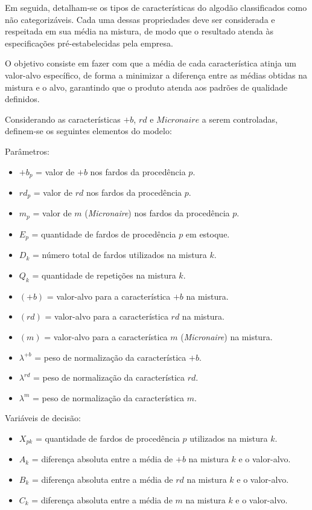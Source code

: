 \documentclass[
    12pt,                %
    openright,           %
    oneside,             %
    a4paper,             %
    english,             %
    spanish,             %
    brazil               %
]{ufscar}
\begin{document}
Em seguida, detalham-se os tipos de características do algodão classificados como não categorizáveis. Cada uma dessas propriedades deve ser considerada e respeitada em sua média na mistura, de modo que o resultado atenda às especificações pré-estabelecidas pela empresa.

O objetivo consiste em fazer com que a média de cada característica atinja um valor-alvo específico, de forma a minimizar a diferença entre as médias obtidas na mistura e o alvo, garantindo que o produto atenda aos padrões de qualidade definidos.

Considerando as características $+b$, $rd$ e $Micronaire$ a serem controladas, definem-se os seguintes elementos do modelo:

Parâmetros:

\begin{itemize}
    \item $+b_p$ = valor de $+b$ nos fardos da procedência $p$.
    \item $rd_p$ = valor de $rd$ nos fardos da procedência $p$.
    \item $m_p$ = valor de $m$ (\textit{Micronaire}) nos fardos da procedência $p$.
    \item $E_p$ = quantidade de fardos de procedência $p$ em estoque.
    \item $D_k$ = número total de fardos utilizados na mistura $k$.
    \item $Q_k$ = quantidade de repetições na mistura $k$.
    \item $(+b)$ = valor-alvo para a característica $+b$ na mistura.
    \item $(rd)$ = valor-alvo para a característica $rd$ na mistura.
    \item $(m)$ = valor-alvo para a característica $m$ (\textit{Micronaire}) na mistura.
    \item $\lambda^{+b}$ = peso de normalização da característica $+b$.
    \item $\lambda^{rd}$ = peso de normalização da característica $rd$.
    \item $\lambda^{m}$ = peso de normalização da característica $m$.
\end{itemize}

Variáveis de decisão:
\begin{itemize}
    \item $X_{pk}$ = quantidade de fardos de procedência $p$ utilizados na mistura $k$.
    \item $A_k$ = diferença absoluta entre a média de $+b$ na mistura $k$ e o valor-alvo.
    \item $B_k$ = diferença absoluta entre a média de $rd$ na mistura $k$ e o valor-alvo.
    \item $C_k$ = diferença absoluta entre a média de $m$ na mistura $k$ e o valor-alvo.
\end{itemize}
\end{document}
